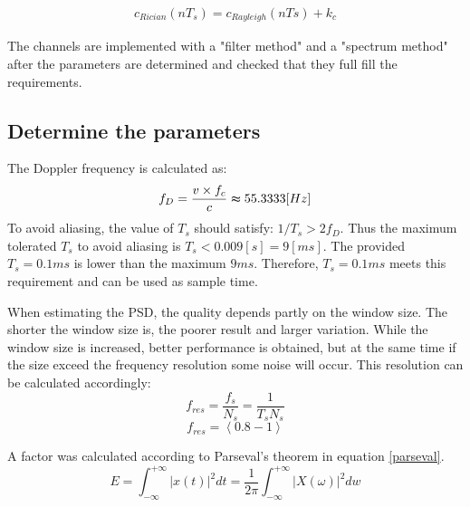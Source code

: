 \documentclass[conference]{IEEEtran}
\begin{document}
    \begin{align}
        c_{Rician}(nT_{s}) = c_{Rayleigh}(nTs) + k_{c} 
        \label{rician}
    \end{align}

The channels are implemented with a "filter method" and a "spectrum method" after the parameters are determined and checked that they full fill the requirements. 

\subsection{Determine the parameters}
    The Doppler frequency is calculated as: $$ f_{D} = \frac{v\times f_{c}}{c} \thickapprox 55.3333 [Hz]$$
    To avoid aliasing, the value of $T_s$ should satisfy: $1/T_{s} > 2f_{D}$. Thus the maximum tolerated $T_s$ to avoid aliasing is $T_{s} < 0.009 [s] = 9 [ms]$. The provided $T_{s} = 0.1 ms$ is lower than the maximum $9 ms$. Therefore, $T_{s} = 0.1 ms$ meets this requirement and can be used as sample time.
    
 
    When estimating the PSD, the quality depends partly on the window size. The shorter the window size is, the poorer result and larger variation. While the window size is increased, better performance is obtained, but at the same time if the size exceed the frequency resolution some noise will occur. This resolution can be calculated accordingly: 
    $$f_{res}  = \frac{f_{s}}{N_{s}} = \frac{1}{T_{s}N_{s}}$$ $$f_{res}  = \left<0.8-1\right>$$
    
A factor was calculated according to Parseval's theorem in equation \ref{parseval}. 
\begin{equation*}
    E = \int_{-\infty}^{+\infty} |x(t)|^2 dt = \frac{1}{2\pi}\int_{-\infty}^{+\infty}|X(\omega)|^2 dw
    \label{parseval}
\end{equation*}
\end{document}
